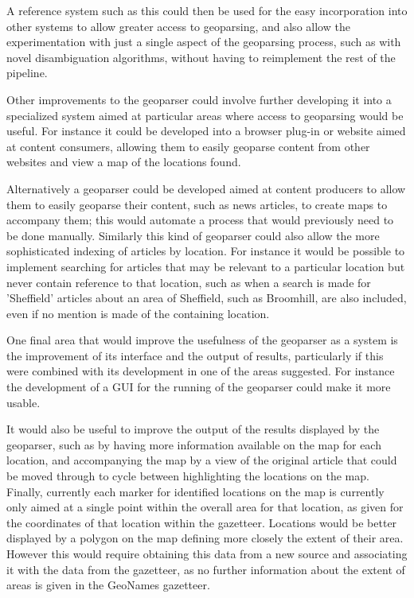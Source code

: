 \documentclass[12pt, a4paper]{report}
\begin{document}
A reference system such as this could then be used for the easy incorporation into other systems to allow greater access to geoparsing, and also allow the experimentation with just a single aspect of the geoparsing process, such as with novel disambiguation algorithms, without having to reimplement the rest of the pipeline.

Other improvements to the geoparser could involve further developing it into a specialized system aimed at particular areas where access to geoparsing would be useful. For instance it could be developed into a browser plug-in or website aimed at content consumers, allowing them to easily geoparse content from other websites and view a map of the locations found.

Alternatively a geoparser could be developed aimed at content producers to allow them to easily geoparse their content, such as news articles, to create maps to accompany them; this would automate a process that would previously need to be done manually. Similarly this kind of geoparser could also allow the more sophisticated indexing of articles by location. For instance it would be possible to implement searching for articles that may be relevant to a particular location but never contain reference to that location, such as when a search is made for 'Sheffield' articles about an area of Sheffield, such as Broomhill, are also included, even if no mention is made of the containing location.

One final area that would improve the usefulness of the geoparser as a system is the improvement of its interface and the output of results, particularly if this were combined with its development in one of the areas suggested. For instance the development of a GUI for the running of the geoparser could make it more usable.

It would also be useful to improve the output of the results displayed by the geoparser, such as by having more information available on the map for each location, and accompanying the map by a view of the original article that could be moved through to cycle between highlighting the locations on the map. Finally, currently each marker for identified locations on the map is currently only aimed at a single point within the overall area for that location, as given for the coordinates of that location within the gazetteer. Locations would be better displayed by a polygon on the map defining more closely the extent of their area. However this would require obtaining this data from a new source and associating it with the data from the gazetteer, as no further information about the extent of areas is given in the GeoNames gazetteer.
\end{document}

